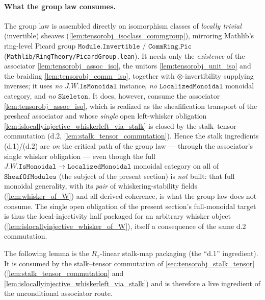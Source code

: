 \paragraph{What the group law consumes.} The group law is assembled directly on
isomorphism classes of \emph{locally trivial} (invertible) sheaves
(\cref{lem:tensorobj_isoclass_commgroup}), mirroring Mathlib's ring-level Picard
group \(\mathtt{Module.Invertible}\) / \(\mathtt{CommRing.Pic}\)
(\texttt{Mathlib/RingTheory/PicardGroup.lean}). It needs only the \emph{existence} of
the associator \cref{lem:tensorobj_assoc_iso}, the unitors \cref{lem:tensorobj_unit_iso}
and the braiding \cref{lem:tensorobj_comm_iso}, together with \(\otimes\)-invertibility
supplying inverses; it uses \emph{no} \(J.W.\mathtt{IsMonoidal}\) instance, \emph{no}
\(\mathtt{LocalizedMonoidal}\) monoidal category, and \emph{no} \(\mathtt{Skeleton}\).
It does, however, consume the associator \cref{lem:tensorobj_assoc_iso}, which is
realized as the sheafification transport of the presheaf associator and whose
\emph{single} open left-whisker obligation \cref{lem:islocallyinjective_whiskerleft_via_stalk}
is closed by the stalk--tensor commutation (d.2, \cref{lem:stalk_tensor_commutation}).
Hence the stalk ingredients (d.1)/(d.2) are \emph{on} the critical path of the group
law --- through the associator's single whisker obligation --- even though the full
\(J.W.\mathtt{IsMonoidal} \to \mathtt{LocalizedMonoidal}\) monoidal category on all of
\(\mathtt{SheafOfModules}\) (the subject of the present section) is \emph{not} built:
that full monoidal generality, with its \emph{pair} of whiskering-stability fields
(\cref{lem:whisker_of_W}) and all derived coherence, is what the group law does not
consume. The single open obligation of the present section's full-monoidal target is
thus the local-injectivity half packaged for an arbitrary whisker object
(\cref{lem:islocallyinjective_whisker_of_W}), itself a consequence of the same d.2
commutation.

The following lemma is the \(R_x\)-linear stalk-map packaging (the ``d.1''
ingredient). It is consumed by the stalk--tensor commutation of
\cref{sec:tensorobj_stalk_tensor} (\cref{lem:stalk_tensor_commutation} and
\cref{lem:islocallyinjective_whiskerleft_via_stalk}) and is therefore a live ingredient
of the unconditional associator route.

